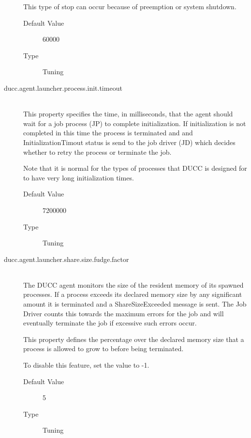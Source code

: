 \begin{description}
          This type of stop can occur because of preemption or system shutdown. 
          \begin{description}
            \item[Default Value] 60000 
            \item[Type] Tuning 
          \end{description}
          
        \item[ducc.agent.launcher.process.init.timeout] \hfill \\
          This property specifies the time, in milliseconds, that the agent should wait for a job 
          process (JP) to complete initialization. If initialization is not completed in this time the 
          process is terminated and and InitializationTimout status is send to the job driver (JD) 
          which decides whether to retry the process or terminate the job. 

          Note that it is normal for the types of processes that DUCC is designed for to have very 
          long initialization times. 
          \begin{description}
          \item[Default Value] 7200000 
          \item[Type] Tuning 
          \end{description}
          

        \item[ducc.agent.launcher.share.size.fudge.factor] \hfill \\
          The DUCC agent monitors the size of the resident memory of its spawned processes. If a 
          process exceeds its declared memory size by any significant amount it is terminated and 
          a ShareSizeExceeded message is sent. The Job Driver counts this towards the maximum 
          errors for the job and will eventually terminate the job if excessive such errors occur. 

          This property defines the percentage over the declared memory size that a process is 
          allowed to grow to before being terminated. 

          To disable this feature, set the value to -1. 
          \begin{description}
            \item[Default Value] 5 
            \item[Type] Tuning 
          \end{description}
          

\end{description}
